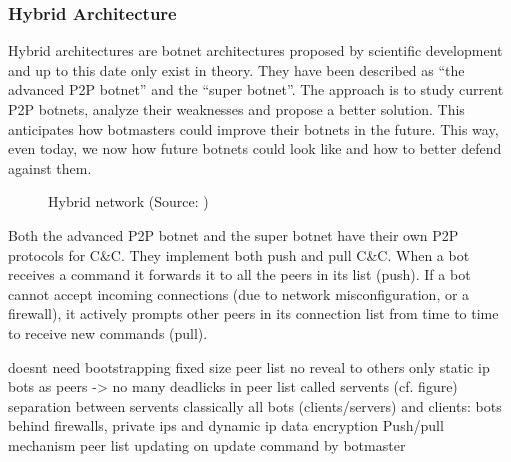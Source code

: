 \documentclass{llncs}
\begin{document}
\subsubsection{Hybrid Architecture}
Hybrid architectures are botnet architectures proposed by scientific development and up to this date only exist in theory. They have been described as ``the advanced P2P botnet''\cite{td1sc} and the ``super botnet''\cite{vogt2007army}. The approach is to study current P2P botnets, analyze their weaknesses and propose a better solution. This anticipates how botmasters could improve their botnets in the future. This way, even today, we now how future botnets could look like and how to better defend against them.

\begin{figure}[htbp]
  \centering
  \caption{Hybrid network (Source: \cite{td1sc})}
  \label{hybrid-network}
\end{figure}

Both the advanced P2P botnet and the super botnet have their own P2P
protocols for C\&C. They implement both push and pull
C\&C.\cite{wang2009systematic} When a bot receives a command it
forwards it to all the peers in its list (push). If a bot cannot
accept incoming connections (due to network misconfiguration, or a
firewall), it actively prompts other peers in its connection list from
time to time to receive new commands (pull).

doesnt need bootstrapping
fixed size peer list no reveal to others 
only static ip bots as peers -> no many deadlicks in peer list called servents (cf. figure)
separation between servents classically all bots (clients/servers) and clients: bots behind firewalls, private ips and dynamic ip
data encryption
Push/pull mechanism
peer list updating on update command by botmaster
\end{document}
